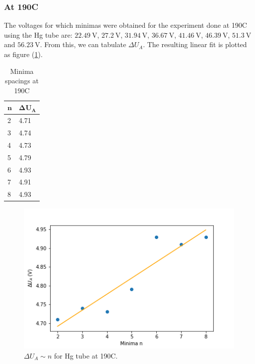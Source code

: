 \documentclass[%
 reprint,
 amsmath,amssymb,
 aps,
]{revtex4-2}
\begin{document}
        \subsubsection{At 190\degree C}
            The voltages for which minimas were obtained for the experiment done at 190\degree C using the Hg tube are: $\SI{22.49}{\volt}$, $\SI{27.2}{\volt}$, $\SI{31.94}{\volt}$, $\SI{36.67}{\volt}$, $\SI{41.46}{\volt}$, $\SI{46.39}{\volt}$, $\SI{51.3}{\volt}$ and $\SI{56.23}{\volt}$. From this, we can tabulate $\Delta U_A$. The resulting linear fit is plotted as figure (\ref{fig:190HgMS}).
            \begin{table}[h!]
            \caption{Minima spacings at 190\degree C}
            \begin{tabular}{|m{1cm}|m{2cm}|}
            \hline
            \hfil $\bm{n}$ & \hfil $\bm{\Delta U_A}$ \\ \hline \hline
            \hfil 2 & \hfil 4.71 \\ \hline
            \hfil 3 & \hfil 4.74 \\ \hline
            \hfil 4 & \hfil 4.73 \\ \hline
            \hfil 5 & \hfil 4.79 \\ \hline
            \hfil 6 & \hfil 4.93 \\ \hline
            \hfil 7 & \hfil 4.91 \\ \hline
            \hfil 8 & \hfil 4.93 \\ \hline
            \end{tabular}
            \label{Tab:190Hg}
            \end{table}
            \begin{figure}[]
                \centering
                \includegraphics[scale = 0.5]{Figures/190HgMS.png}
                \caption{$\Delta U_A \sim n$ for Hg tube at 190\degree C.}
                \label{fig:190HgMS}
            \end{figure}
\end{document}
